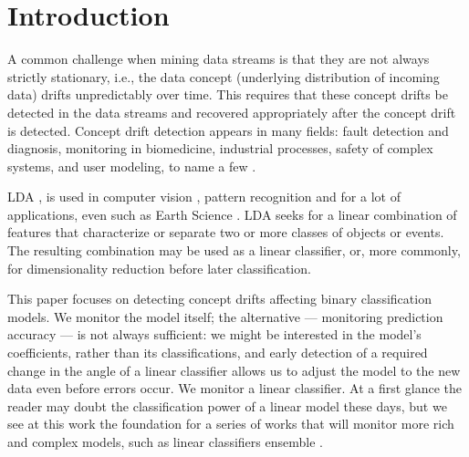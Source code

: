 \documentclass{sig-alternate-05-2015}
\begin{document}


%
%

%
%
\printccsdesc



\section{Introduction}
A common challenge when mining data streams is that
they are not always strictly stationary, i.e., the data
concept (underlying distribution of incoming data) drifts 
unpredictably over time. This requires that these concept drifts be detected 
in the data streams and recovered appropriately after the concept drift 
is detected. 
Concept drift detection appears in many fields: fault detection and
diagnosis, monitoring in biomedicine, industrial processes,  
safety of complex systems, and user modeling, to name a few
\cite{basseville1993detection}.

\par LDA \cite{fisher1936use}, is used in computer vision
\cite{turk1991eigenfaces}, pattern recognition \cite{duda2012pattern} and
for a lot of applications, even such as Earth Science
\cite{tahmasebi2010application}.
LDA seeks for a linear combination of features that
characterize or separate two or more classes of objects or events.
The resulting combination may be used as a linear classifier, or, 
more commonly, for dimensionality reduction before later classification.

\par
This paper focuses on detecting concept drifts affecting binary 
classification models.
We monitor the model itself; the alternative --- monitoring prediction
accuracy --- is not always sufficient: we might be interested in the model's
coefficients, rather than its classifications, and early detection of a
required change in the angle of a linear classifier allows us to adjust 
the model to the new data even before errors occur.
We monitor a linear classifier. At a first glance the reader may doubt the
classification power of a linear model these days, but we see at this work the
foundation for a series of works that will monitor more rich and complex
models, such as linear classifiers ensemble \cite{osadchy2015k}.
\end{document}
